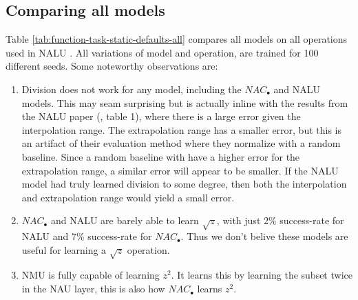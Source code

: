 \subsection{Comparing all models}
\label{sec:appendix:comparison-all-models}

Table \ref{tab:function-task-static-defaults-all} compares all models on all operations used in NALU \cite{trask-nalu}. All variations of model and operation, are trained for 100 different seeds. Some noteworthy observations are:

\begin{enumerate}
    \item Division does not work for any model, including the $NAC_{\bullet}$ and NALU models. This may seam surprising but is actually inline with the results from the NALU paper (\citet{trask-nalu}, table 1), where there is a large error given the interpolation range. The extrapolation range has a smaller error, but this is an artifact of their evaluation method where they normalize with a random baseline. Since a random baseline with have a higher error for the extrapolation range, a similar error will appear to be smaller. If the NALU model had truly learned division to some degree, then both the interpolation and extrapolation range would yield a small error.
    \item $NAC_{\bullet}$ and NALU are barely able to learn $\sqrt{z}$, with just 2\% success-rate for NALU and 7\% success-rate for $NAC_{\bullet}$. Thus we don't belive these models are useful for learning a $\sqrt{z}$ operation.
    \item NMU is fully capable of learning $z^2$. It learns this by learning the subset twice in the NAU layer, this is also how $NAC_{\bullet}$ learns $z^2$.
\end{enumerate}


